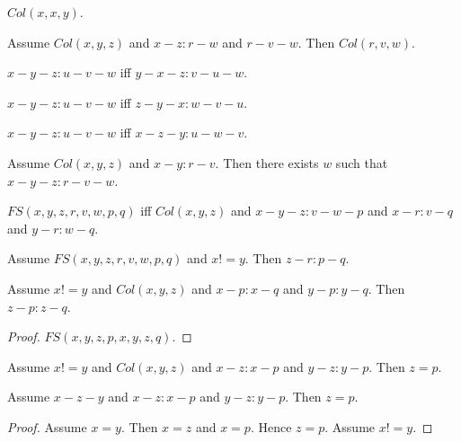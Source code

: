 \documentclass{article}
\begin{document}
\begin{forthel}
    \begin{lemma}[L4_12]
      $Col(x,x,y)$.
    \end{lemma}

    \begin{lemma}[L4_13]
      Assume $Col(x,y,z)$ and $x-z : r-w$ and $r-v-w$. Then $Col(r,v,w)$.
    \end{lemma}

    \begin{lemma}[L4_14_1]
      $x-y-z : u-v-w$ iff $y-x-z : v-u-w$.
    \end{lemma}

    \begin{lemma}[L4_14_2]
      $x-y-z : u-v-w$ iff $z-y-x : w-v-u$.
    \end{lemma}

    \begin{lemma}[L4_14_3]
      $x-y-z : u-v-w$ iff $x-z-y : u-w-v$.
    \end{lemma}

    \begin{axiom}[L4_14]
      Assume $Col(x,y,z)$ and $x-y : r-v$. Then there exists $w$ such that $x-y-z : r-v-w$.
    \end{axiom}

    \begin{definition}[L4_15]
      $FS(x,y,z,r,v,w,p,q)$ iff $Col(x,y,z)$ and $x-y-z : v-w-p$ and $x-r : v-q$ and $y-r : w-q$.
    \end{definition}

    \begin{axiom}[L4_16]
      Assume $FS(x,y,z,r,v,w,p,q)$ and $x != y$. Then $z-r : p-q$.
    \end{axiom}


    \begin{lemma}[L4_17]
      Assume $x != y$ and $Col(x,y,z)$ and $x-p : x-q$ and $y-p : y-q$. Then $z-p : z-q$.
    \end{lemma}
    \begin{proof}
    	$FS(x,y,z,p,x,y,z,q)$.
    \end{proof}


    \begin{lemma}[L4_18]
      Assume $x != y$ and $Col(x,y,z)$ and $x-z : x-p$ and $y-z : y-p$. Then $z = p$.
    \end{lemma}

    \begin{lemma}[L4_19]
      Assume $x-z-y$ and $x-z : x-p$ and $y-z : y-p$. Then $z = p$.
    \end{lemma}
    \begin{proof}
      Assume $x = y$. Then $x = z$ and $x = p$. Hence $z = p$. Assume $x != y$.
    \end{proof}
  \end{forthel}
\end{document}
